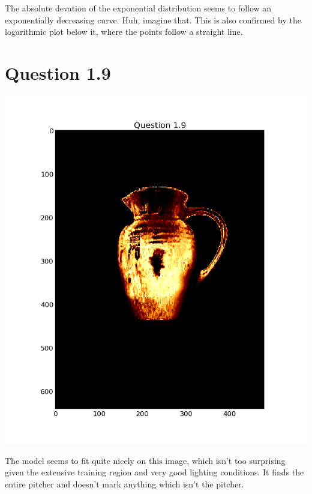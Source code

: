 \documentclass[11pt,a4paper]{article}
\begin{document}
The absolute devation of the exponential distribution seems to follow an exponentially decreasing curve. Huh, imagine that. This is also confirmed by the logarithmic plot below it, where the points follow a straight line.
\section{Question 1.9}
\includegraphics[width=1.1\textwidth]{figure_7.png}

The model seems to fit quite nicely on this image, which isn't too surprising given the
extensive training region and very good lighting conditions. It finds the entire pitcher
and doesn't mark anything which isn't the pitcher.
\end{document}
